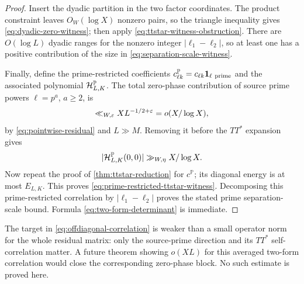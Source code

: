 \begin{proof}
Insert the dyadic partition in the two factor coordinates.  The product
constraint leaves $O_W(\log X)$ nonzero pairs, so the triangle
inequality gives \eqref{eq:dyadic-zero-witness}; then apply
\eqref{eq:ttstar-witness-obstruction}.  There are $O(\log L)$ dyadic
ranges for the nonzero integer $|\ell_1-\ell_2|$, so at least one has a
positive contribution of the size in
\eqref{eq:separation-scale-witness}.

Finally, define the prime-restricted coefficients
$c^{\mathbb P}_{\ell k}=c_{\ell k}\mathbf 1_{\ell\ {\rm prime}}$ and the
associated polynomial $\mathcal H^{\mathbb P}_{L,K}$.  The total zero-phase
contribution of source prime powers
$\ell=p^a$, $a\ge2$, is
\begin{equation}
 \ll_{W,\varepsilon}X L^{-1/2+\varepsilon}
 =o(X/\log X),
 \label{eq:source-powers-below-witness}
\end{equation}
by \eqref{eq:pointwise-residual} and $L\gg M$.  Removing it before the
$TT^*$ expansion gives
\[
 |\mathcal H^{\mathbb P}_{L,K}(0,0)|
 \gg_{W,\eta}X/\log X.
\]
Now repeat the proof of \cref{thm:ttstar-reduction} for
$c^{\mathbb P}$; its diagonal energy is at most $E_{L,K}$.  This proves
\eqref{eq:prime-restricted-ttstar-witness}.  Decomposing this
prime-restricted correlation by $|\ell_1-\ell_2|$ proves the stated
prime separation-scale bound.  Formula
\eqref{eq:two-form-determinant} is immediate.
\end{proof}

\begin{remark}
The target in \eqref{eq:offdiagonal-correlation} is weaker than a small
operator norm for the whole residual matrix: only the source-prime
direction and its $TT^*$ self-correlation matter.  A future theorem
showing $o(XL)$ for this averaged two-form correlation would close the
corresponding zero-phase block.  No such estimate is proved here.
\end{remark}

